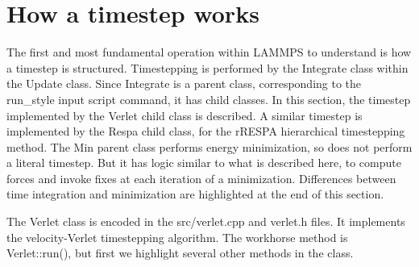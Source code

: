 \documentclass{article}
\begin{document}


\pagebreak
\section{How a timestep works}

The first and most fundamental operation within LAMMPS to understand
is how a timestep is structured.  Timestepping is performed by the
Integrate class within the Update class.  Since Integrate is a parent
class, corresponding to the run\_style input script command, it has
child classes.  In this section, the timestep implemented by the
Verlet child class is described.  A similar timestep is implemented by
the Respa child class, for the rRESPA hierarchical timestepping
method.  The Min parent class performs energy minimization, so does
not perform a literal timestep.  But it has logic similar to what is
described here, to compute forces and invoke fixes at each iteration
of a minimization.  Differences between time integration and
minimization are highlighted at the end of this section.

The Verlet class is encoded in the src/verlet.cpp and verlet.h files.
It implements the velocity-Verlet timestepping algorithm.  The
workhorse method is Verlet::run(), but first we highlight several
other methods in the class.
\end{document}
